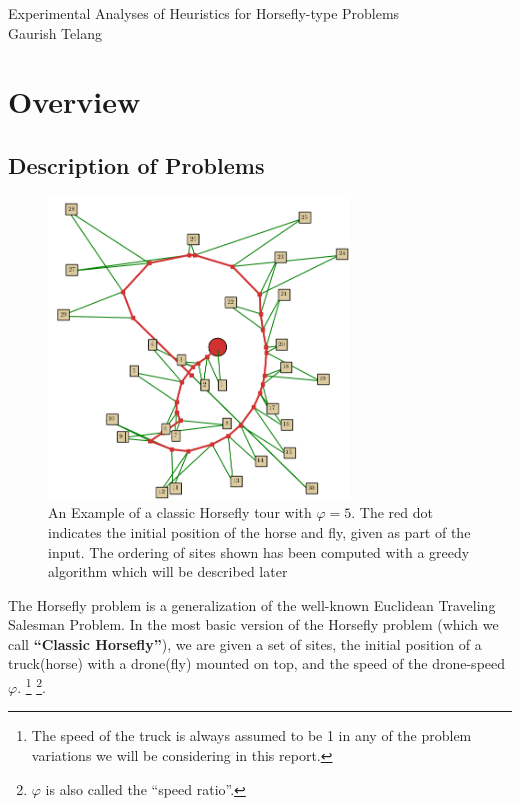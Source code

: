 \documentclass[12pt]{report}
\author{Gaurish Telang}
\begin{document}
\begin{titlepage}
	\centering
        {\Huge Experimental Analyses of Heuristics for Horsefly-type Problems\\}
        \vspace{20mm}
        {\Large Gaurish Telang}
\end{titlepage}
\setcounter{page}{2} 

\setcounter{tocdepth}{1}
\tableofcontents
{}

\part{Overview}
\chapter{Description of Problems}



\begin{figure}[H]
   \centering

    \includegraphics[width=8cm]{../webs/docs/prelim_example_phi5.png}
    \caption{An Example of a classic Horsefly tour with $\varphi=5$. The red dot
    indicates the initial position of the horse and fly, given as part of 
    the input. The ordering of sites shown has been computed with a greedy 
    algorithm which will be described later}
    \label{fig:prelim-example}
\end{figure}


The Horsefly problem is a generalization of the well-known Euclidean Traveling Salesman Problem.
In the most basic version of the Horsefly problem (which we call \textbf{``Classic Horsefly''}), we are given a set of sites, the
initial position of a truck(horse) with a drone(fly) mounted on top, and the speed of the
drone-speed $\varphi$. \footnote{ The speed of the truck is always assumed to be 1 in any of the problem 
variations we will be considering in this report.} \footnote{ $\varphi$ is also called the ``speed ratio''.}. 
\end{document}
